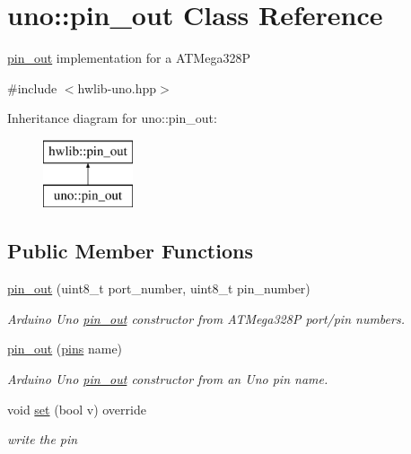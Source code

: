 \hypertarget{classuno_1_1pin__out}{}\section{uno\+:\+:pin\+\_\+out Class Reference}
\label{classuno_1_1pin__out}


\hyperlink{classuno_1_1pin__out}{pin\+\_\+out} implementation for a A\+T\+Mega328P  




{\ttfamily \#include $<$hwlib-\/uno.\+hpp$>$}

Inheritance diagram for uno\+:\+:pin\+\_\+out\+:\begin{figure}[H]
\begin{center}
\leavevmode
\includegraphics[height=2.000000cm]{classuno_1_1pin__out}
\end{center}
\end{figure}
\subsection*{Public Member Functions}
\begin{DoxyCompactItemize}
\item 
\hyperlink{classuno_1_1pin__out_ad2979873a87460afe02fb22c7898d641}{pin\+\_\+out} (uint8\+\_\+t port\+\_\+number, uint8\+\_\+t pin\+\_\+number)
\begin{DoxyCompactList}\small\item\em Arduino Uno \hyperlink{classuno_1_1pin__out}{pin\+\_\+out} constructor from A\+T\+Mega328P port/pin numbers. \end{DoxyCompactList}\item 
\hyperlink{classuno_1_1pin__out_a6bfc4c926f0d9f1e7835cf822343b67b}{pin\+\_\+out} (\hyperlink{namespaceuno_a0a859f3512bcc3027a090ae07befd5b2}{pins} name)
\begin{DoxyCompactList}\small\item\em Arduino Uno \hyperlink{classuno_1_1pin__out}{pin\+\_\+out} constructor from an Uno pin name. \end{DoxyCompactList}\item 
void \hyperlink{classuno_1_1pin__out_acdbf9464c592814d5b345dfb4aaa24c9}{set} (bool v) override
\begin{DoxyCompactList}\small\item\em write the pin \end{DoxyCompactList}\end{DoxyCompactItemize}


